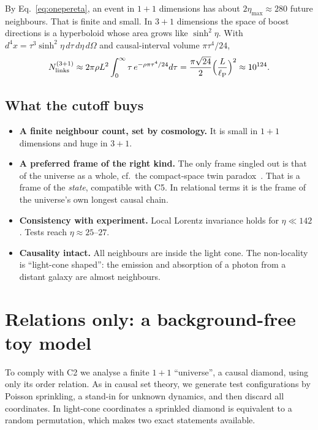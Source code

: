 \documentclass[11pt,a4paper]{article}
\newcommand{\lP}{\ell_{\mathrm P}}
\begin{document}
By Eq.~\eqref{eq:onepereta}, an event in $1+1$ dimensions has about $2\eta_{\max}\approx280$ future neighbours. That is finite and small. In $3+1$ dimensions the space of boost directions is a hyperboloid whose area grows like $\sinh^2\eta$. With $d^4x=\tau^3\sinh^2\!\eta\,d\tau\,d\eta\,d\Omega$ and causal-interval volume $\pi\tau^4/24$,
\begin{equation}
N^{(3+1)}_{\rm links}\approx2\pi\rho L^2\int_0^\infty\tau\,e^{-\rho\pi\tau^4/24}d\tau=\frac{\pi\sqrt{24}}{2}\Big(\frac{L}{\lP}\Big)^2\approx10^{124}.
\end{equation}

\subsection{What the cutoff buys}
\begin{itemize}[leftmargin=*,itemsep=2pt]
\item \textbf{A finite neighbour count, set by cosmology.} It is small in $1+1$ dimensions and huge in $3+1$.
\item \textbf{A preferred frame of the right kind.} The only frame singled out is that of the universe as a whole, cf.\ the compact-space twin paradox~\cite{BarrowLevin01}. That is a frame of the \emph{state}, compatible with C5. In relational terms it is the frame of the universe's own longest causal chain.
\item \textbf{Consistency with experiment.} Local Lorentz invariance holds for $\eta\ll142$. Tests reach $\eta\approx25$--$27$.
\item \textbf{Causality intact.} All neighbours are inside the light cone. The non-locality is ``light-cone shaped'': the emission and absorption of a photon from a distant galaxy are almost neighbours.
\end{itemize}

\section{Relations only: a background-free toy model}
To comply with C2 we analyse a finite $1+1$ ``universe'', a causal diamond, using only its order relation. As in causal set theory, we generate test configurations by Poisson sprinkling, a stand-in for unknown dynamics, and then discard all coordinates. In light-cone coordinates a sprinkled diamond is equivalent to a random permutation, which makes two exact statements available.
\end{document}
